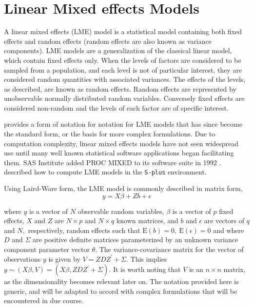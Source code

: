 \documentclass[12pt, a4paper]{report}
\theoremstyle{plain}
\theoremstyle{definition}
\theoremstyle{remark}
\begin{document}
\section{Linear Mixed effects Models}
A linear mixed effects (LME) model is a statistical model containing both fixed effects and random effects (random effects are also known as variance components). LME models are a generalization of the classical linear model, which contain fixed effects only. When the levels of factors are considered to be sampled from a population,
and each level is not of particular interest, they are considered random quantities with associated variances.
The effects of the levels, as described, are known as random effects. Random effects are represented by unobservable
normally distributed random variables. Conversely fixed effects are considered non-random and the
levels of each factor are of specific interest.



\citet{LW82} provides a form of notation for notation for LME models that has since become the standard form, or the basis for more complex formulations. Due to computation complexity, linear mixed effects models have not seen widespread use until many well known statistical software applications began facilitating them. SAS Institute added PROC MIXED to its software suite in 1992 \citep{singer}. \citet{PB} described how to compute LME models in the \texttt{S-plus} environment.

Using Laird-Ware form, the LME model is commonly described in matrix form,
\begin{equation}
y = X\beta + Zb + \epsilon
\label{LW}
\end{equation}

\noindent where $y$ is a vector of $N$ observable random variables, $\beta$ is a vector of $p$ fixed effects, $X$ and $Z$ are $N \times p$ and $N \times q$ known matrices, and $b$ and $\epsilon$  are vectors of $q$ and $N,$ respectively, random effects such that $\mathrm{E}(b)=0, \ \mathrm{E}(\epsilon)=0$
and
where $D$ and $\Sigma$ are positive definite matrices parameterized by an unknown variance component parameter vector $ \theta.$ The variance-covariance matrix for the vector of observations $y$ is given by $V = ZDZ^{\prime}+ \Sigma.$ This implies $y \sim(X\beta, V) = (X\beta,ZDZ^{\prime}+ \Sigma)$. It is worth noting that $V$ is an $n \times n$ matrix, as the dimensionality becomes relevant later on. The notation provided here is generic, and will be adapted to accord with complex formulations that will be encountered in due course.
\end{document}
